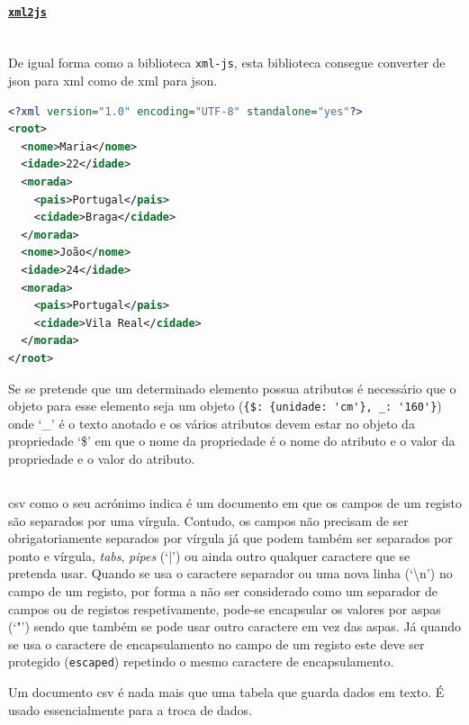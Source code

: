 \paragraph{\href{https://www.npmjs.com/package/xml2js}{\texttt{xml2js}}} \mbox{} \\

De igual forma como a biblioteca \texttt{xml-js}, esta biblioteca consegue converter de \acrshort{json} para \acrshort{xml} como de \acrshort{xml} para \acrshort{json}. 

\begin{lstlisting}[language=xml, caption=Resultado da conversão do exemplo~\ref{exem:jsonBib} usando o conversor \texttt{xml2js}]
<?xml version="1.0" encoding="UTF-8" standalone="yes"?>
<root>
  <nome>Maria</nome>
  <idade>22</idade>
  <morada>
    <pais>Portugal</pais>
    <cidade>Braga</cidade>
  </morada>
  <nome>João</nome>
  <idade>24</idade>
  <morada>
    <pais>Portugal</pais>
    <cidade>Vila Real</cidade>
  </morada>
</root>
\end{lstlisting}

Se se pretende que um determinado elemento possua atributos é necessário que o objeto para esse elemento seja um objeto (\verb|{$: {unidade: 'cm'}, _: '160'}|) onde `\_' é o texto anotado e os vários atributos devem estar no objeto da propriedade `\$' em que o nome da propriedade é o nome do atributo e o valor da propriedade e o valor do atributo.

\subsection{}

\acrfull{csv} como o seu acrónimo indica é um documento em que os campos de um registo são separados por uma vírgula. Contudo, os campos não precisam de ser obrigatoriamente separados por vírgula já que podem também ser separados por ponto e vírgula, \textit{tabs}, \textit{pipes} (`|') ou ainda outro qualquer caractere que se pretenda usar. Quando se usa o caractere separador ou uma nova linha (`\backslash{}n') no campo de um registo, por forma a não ser considerado como um separador de campos ou de registos respetivamente, pode-se encapsular os valores por aspas (`"') sendo que também se pode usar outro caractere em vez das aspas. Já quando se usa o caractere de encapsulamento no campo de um registo este deve ser protegido (\texttt{escaped}) repetindo o mesmo caractere de encapsulamento.

Um documento \acrshort{csv} é nada mais que uma tabela que guarda dados em texto. É usado essencialmente para a troca de dados.

